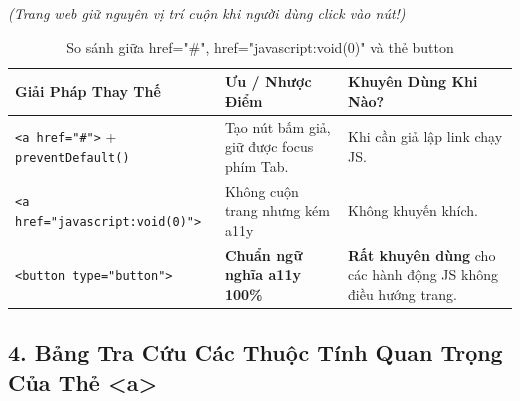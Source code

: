 \documentclass[11pt,oneside]{book}
\newcommand{\codeinline}[1]{\textcolor{accentOrange}{\texttt{#1}}}
\begin{document}
\begin{browserWindow}
\sffamily\small
\tcbox[on line, arc=3pt, colback=primaryBlue!10, colframe=primaryBlue!40, left=8pt, right=8pt, top=3pt, bottom=3pt]{\textcolor{primaryBlue}{\bfseries Mở Hộp Thoại}} \;\;
\textit{(Trang web giữ nguyên vị trí cuộn khi người dùng click vào nút!)}
\end{browserWindow}

\begin{table}[H]
\centering
\begin{prettyTableBox}
\small
{}
\begin{tabularx}{\linewidth}{lXX}
\rowcolor{primaryBlue}
\color{white}\textbf{Giải Pháp Thay Thế} & \color{white}\textbf{Ưu / Nhược Điểm} & \color{white}\textbf{Khuyên Dùng Khi Nào?} \\
\hline
\codeinline{<a href="\#">} + \codeinline{preventDefault()} & Tạo nút bấm giả, giữ được focus phím Tab. & Khi cần giả lập link chạy JS. \\
\codeinline{<a href="javascript:void(0)">} & Không cuộn trang nhưng kém a11y & Không khuyến khích. \\
\codeinline{<button type="button">} & \textbf{Chuẩn ngữ nghĩa a11y 100\%} & \textbf{Rất khuyên dùng} cho các hành động JS không điều hướng trang. \\
\end{tabularx}
\end{prettyTableBox}
\vspace{-2pt}
\caption{So sánh giữa href="\#", href="javascript:void(0)" và thẻ button}
\end{table}

\subsection{4. Bảng Tra Cứu Các Thuộc Tính Quan Trọng Của Thẻ <a>}
\end{document}
